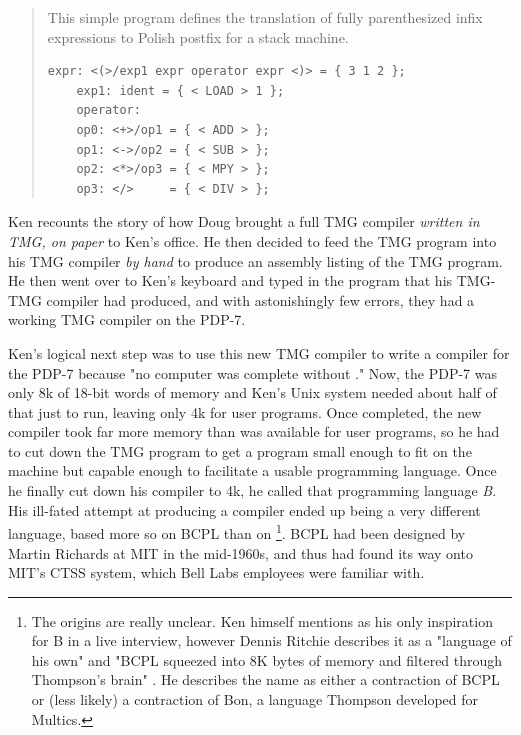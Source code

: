 \begin{quotation}
This simple program defines the translation of fully parenthesized infix 
expressions to Polish postfix for a stack machine.
\begin{lstlisting}[frame=single]
    expr: <(>/exp1 expr operator expr <)> = { 3 1 2 };
    exp1: ident = { < LOAD > 1 };
    operator:
    op0: <+>/op1 = { < ADD > };
    op1: <->/op2 = { < SUB > };
    op2: <*>/op3 = { < MPY > };
    op3: </>     = { < DIV > };
\end{lstlisting}
\end{quotation}

Ken recounts\cite{kernighan_interviews_thompson_2019}
the story of how Doug brought a full TMG compiler \textit{written in TMG,
on paper} to Ken's office. He then decided to feed the TMG program into his TMG compiler
\textit{by hand} to produce an assembly listing of the TMG program.
He then went over to Ken's keyboard and typed in the program that his TMG-TMG compiler
had produced, and with astonishingly few errors, they had a working TMG compiler on the PDP-7.

Ken's logical next step was to use this new TMG compiler to
write a \ftn{} compiler for the PDP-7 because
"no computer was complete without \ftn{}."
Now, the PDP-7 was only 8k of 18-bit words of memory and Ken's Unix system needed
about half of that just to run, leaving only 4k for user programs.
Once completed, the new \ftn{} compiler took far more memory than was available for
user programs, so he had to cut down the TMG program to get a program small enough to
fit on the machine but capable enough to facilitate a usable programming language.
Once he finally cut down his compiler to 4k, he called that programming language \textit{B}.
His ill-fated attempt at producing a \ftn{} compiler ended up being a very different language,
based more so on BCPL than on \ftn{}
\footnote{The origins are really unclear. Ken himself mentions \ftn{} as his only inspiration
for B in a live interview\cite{kernighan_interviews_thompson_2019},
however Dennis Ritchie describes it as a "language of his own" and
"BCPL squeezed into 8K bytes of memory and filtered through Thompson's brain"
\cite{development_of_c_language_ritchie_1996}.
He describes the name as either a contraction of BCPL or (less likely) a contraction
of Bon, a language Thompson developed for Multics.}.
BCPL had been designed by Martin Richards at MIT in the mid-1960s, and thus had found
its way onto MIT's CTSS system, which Bell Labs employees were familiar with.

